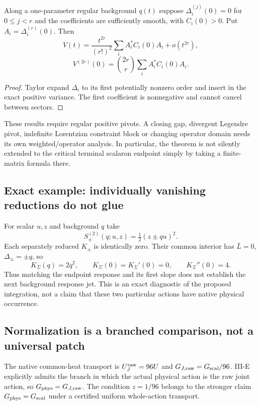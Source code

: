 \documentclass[12pt,a4paper]{article}
\begin{document}
\begin{proposition}
\label{paper3a:proposition:atlas-first-nonzero-higher-order-response-mismatch-4fe1b0f}

Along a one-parameter regular background $q(t)$ suppose
$\Delta_i^{(j)}(0)=0$ for $0\le j<r$ and the coefficients are
sufficiently smooth, with $C_i(0)>0$.  Put $A_i=\Delta_i^{(r)}(0)$.
Then
\[
 V(t)=\frac{t^{2r}}{(r!)^2}\sum_iA_i^*C_i(0)A_i+o(t^{2r}),
\]
\[
 V^{(2r)}(0)=\binom{2r}{r}\sum_iA_i^*C_i(0)A_i.
\]
\end{proposition}
\begin{proof}
Taylor expand $\Delta_i$ to its first potentially nonzero order and
insert in the exact positive variance.  The first coefficient is
nonnegative and cannot cancel between sectors.
\end{proof}

These results require regular positive pivots.  A closing gap, divergent
Legendre pivot, indefinite Lorentzian constraint block or changing
operator domain needs its own weighted/operator analysis.  In particular,
the theorem is not silently extended to the critical terminal scalaron
endpoint simply by taking a finite-matrix formula there.

\subsection{Exact example: individually vanishing reductions do not glue}
For scalar $u,z$ and background $q$ take
\[
 S_\pm^{(2)}(q;u,z)=\tfrac12(z\pm qu)^2.
\]
Each separately reduced $K_\pm$ is identically zero.  Their common
interior has $\bar L=0$, $\Delta_\pm=\pm q$, so
\[
 K_\Sigma(q)=2q^2,\qquad
 K_\Sigma(0)=K_\Sigma'(0)=0,\qquad K_\Sigma''(0)=4.
\]
Thus matching the endpoint response and its first slope does not
establish the next background response jet.  This is an exact diagnostic
of the proposed integration, not a claim that these two particular
actions have native physical occurrence.

\subsection{Normalization is a branched comparison, not a universal patch}
The native common-heat transport is
$U_J^{\rm raw}=96U$ and $G_{J,\rm raw}=G_{\rm scal}/96$.
III-E explicitly admits the branch in which the actual physical action
is the raw joint action, so $G_{\rm phys}=G_{J,\rm raw}$.  The condition
$z=1/96$ belongs to the stronger claim $G_{\rm phys}=G_{\rm scal}$
under a certified uniform whole-action transport.
\end{document}
